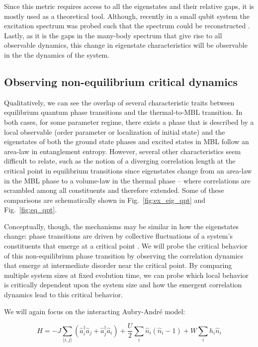 Since this metric requires access to all the eigenstates and their relative gaps, it is mostly used as a theoretical tool\cite{Huse2013,Nandkishore2015}. Although, recently in a small qubit system the excitation spectrum was probed such that the spectrum could be reconstructed \cite{Roushan2017}. Lastly, as it is the gaps in the many-body spectrum that give rise to all observable dynamics, this change in eigenstate characteristics will be observable in the the dynamics of the system.

\subsection{Observing non-equilibrium critical dynamics}

Qualitatively, we can see the overlap of several characteristic traits between equilibrium quantum phase transitions and the thermal-to-MBL transition. In both cases, for some parameter regime, there exists a phase that is described by a local observable (order parameter or localization of initial state) and the eigenstates of both the ground state phases and excited states in MBL follow an area-law in entanglement entropy. However, several other characteristics seem difficult to relate, such as the notion of a diverging correlation length at the critical point in equilibrium transitions since eigenstates change from an area-law in the MBL phase to a volume-law in the thermal phase -- where correlations are scrambled among all constituents and therefore extended. Some of these comparisons are schematically shown in Fig.~\ref{fig:ex_eig_qpt} and Fig.~\ref{fig:eq_qpt}. 

Conceptually, though, the mechanisms may be similar in how the eigenstates change: phase transitions are driven by collective fluctuations of a system's constituents that emerge at a critical point \cite{Tauber2017,Sachdev2011,Landau1937}. We will probe the critical behavior of this non-equilibrium phase transition by observing the correlation dynamics that emerge at intermediate disorder near the critical point. By comparing multiple system sizes at fixed evolution time, we can probe which local behavior is critically dependent upon the system size and how the emergent correlation dynamics lead to this critical behavior.

We will again focus on the interacting Aubry-Andr\'e model\cite{Aubry1980}: 

\begin{equation}
\label{eqn:AAM}
H = -  J \sum_{\langle i,j \rangle}  \left ( \hat{a}_i^\dagger \hat{a}_j + \hat{a}_j^\dagger \hat{a}_i  \right ) + \frac{U}{2} \sum_{i} \hat{n}_i (\hat{n}_i - 1 ) + W \sum_i h_i \hat{n}_i
\end{equation}

